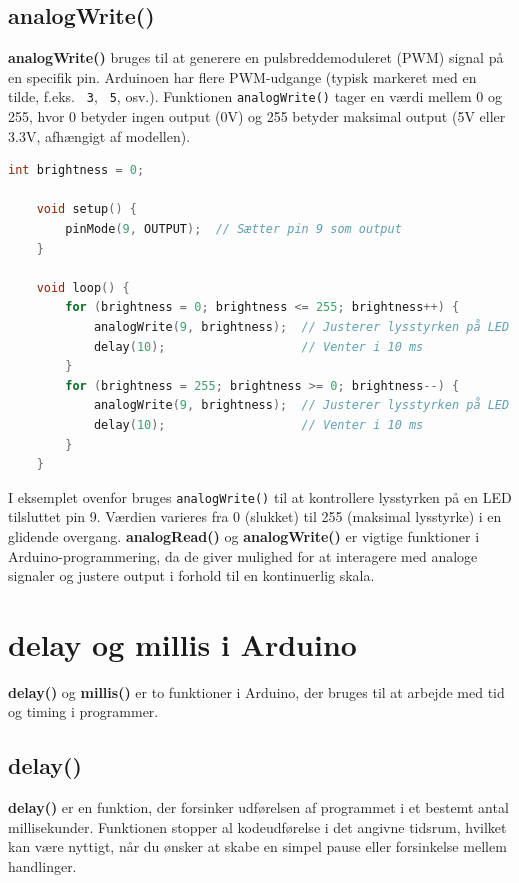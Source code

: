 \subsection{analogWrite()}
\textbf{analogWrite()} bruges til at generere en pulsbreddemoduleret (PWM) signal på en specifik pin. Arduinoen har flere PWM-udgange (typisk markeret med en tilde, f.eks. \texttt{~3}, \texttt{~5}, osv.). Funktionen \texttt{analogWrite()} tager en værdi mellem 0 og 255, hvor 0 betyder ingen output (0V) og 255 betyder maksimal output (5V eller 3.3V, afhængigt af modellen).

\begin{lstlisting}[language=C++, caption=Eksempel på brug af analogWrite]
	int brightness = 0;
	
	void setup() {
		pinMode(9, OUTPUT);  // Sætter pin 9 som output
	}
	
	void loop() {
		for (brightness = 0; brightness <= 255; brightness++) {
			analogWrite(9, brightness);  // Justerer lysstyrken på LED'en
			delay(10);                   // Venter i 10 ms
		}
		for (brightness = 255; brightness >= 0; brightness--) {
			analogWrite(9, brightness);  // Justerer lysstyrken på LED'en
			delay(10);                   // Venter i 10 ms
		}
	}
\end{lstlisting}
I eksemplet ovenfor bruges \texttt{analogWrite()} til at kontrollere lysstyrken på en LED tilsluttet pin 9. Værdien varieres fra 0 (slukket) til 255 (maksimal lysstyrke) i en glidende overgang.
\newline\newline\noindent
\textbf{analogRead()} og \textbf{analogWrite()} er vigtige funktioner i Arduino-programmering, da de giver mulighed for at interagere med analoge signaler og justere output i forhold til en kontinuerlig skala.

\section{delay og millis i Arduino}
\textbf{delay()} og \textbf{millis()} er to funktioner i Arduino, der bruges til at arbejde med tid og timing i programmer.

\subsection{delay()}
\textbf{delay()} er en funktion, der forsinker udførelsen af programmet i et bestemt antal millisekunder. Funktionen stopper al kodeudførelse i det angivne tidsrum, hvilket kan være nyttigt, når du ønsker at skabe en simpel pause eller forsinkelse mellem handlinger.

